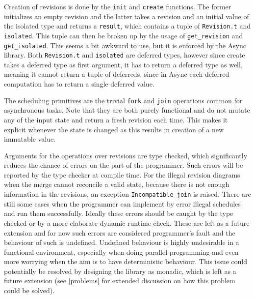 \documentclass[12pt,twoside,notitlepage]{report}
\begin{document}
 
Creation of revisions is done by the {\tt init} and {\tt create} functions. The former initializes an empty revision and the latter takes a revision and an initial value of the isolated type and returns a {\tt result}, which contains a tuple of {\tt Revision.t} and {\tt isolated}. This tuple can then be broken up by the usage of {\tt get\_revision} and {\tt get\_isolated}. This seems a bit awkward to use, but it is enforced by the Async library. Both {\tt Revision.t} and {\tt isolated} are deferred types, however since create takes a deferred type as first argument, it has to return a deferred type as well, meaning it cannot return a tuple of deferreds, since in Async each deferred computation has to return a single deferred value.

The scheduling primitives are the trivial {\tt fork} and {\tt join} operations common for asynchronous tasks. Note that they are both purely functional and do not mutate any of the input state and return a fresh revision each time. This makes it explicit whenever the state is changed as this results in creation of a new immutable value. 


Arguments for the operations over revisions are type checked, which significantly reduces the chance of errors on the part of the programmer. Such errors will be reported by the type checker at compile time. For the illegal revision diagrams when the merge cannot reconcile a valid state, because there is not enough information in the revisions, an exception {\tt Incompatible\_join} is raised. There are still some cases when the programmer can implement by error illegal schedules and run them successfully. Ideally these errors should be caught by the type checked or by a more elaborate dynamic runtime check. These are left as a future extension and for now such errors are considered programmer's fault and the behaviour of such is undefined. Undefined behaviour is highly undesirable in a functional environment, especially when doing parallel programming and even more worrying when the aim is to have deterministic behaviour. This issue could potentially be resolved by designing the library as monadic, which is left as a future extension (see \ref{problems} for extended discussion on how this problem could be solved).   
\end{document}
